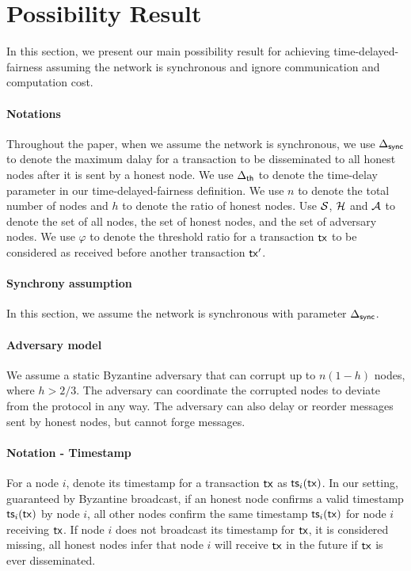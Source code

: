 \section{Possibility Result} \label{sec:result}

In this section, we present our main possibility result for achieving time-delayed-fairness assuming the network is synchronous and ignore communication and computation cost. 


\paragraph{Notations} Throughout the paper, when we assume the network is synchronous, we use $\Delta_{\mathsf{sync}}$ to denote the maximum dalay for a transaction to be disseminated to all honest nodes after it is sent by a honest node. We use $\Delta_{\mathsf{th}}$ to denote the time-delay parameter in our time-delayed-fairness definition. We use $n$ to denote the total number of nodes and $h$ to denote the ratio of honest nodes. Use $\mathcal{S}$, $\mathcal{H}$ and $\mathcal{A}$ to denote the set of all nodes, the set of honest nodes, and the set of adversary nodes. We use $\varphi$ to denote the threshold ratio for a transaction $\mathsf{tx}$ to be considered as received before another transaction $\mathsf{tx}'$. 

\paragraph{Synchrony assumption} In this section, we assume the network is synchronous with parameter $\Delta_{\mathsf{sync}}$.  

\paragraph{Adversary model} We assume a static Byzantine adversary that can corrupt up to $n(1-h)$ nodes, where $h>2/3$. The adversary can coordinate the corrupted nodes to deviate from the protocol in any way. The adversary can also delay or reorder messages sent by honest nodes, but cannot forge messages. 

\paragraph{Notation - Timestamp} For a node $i$, denote its timestamp for a transaction $\mathsf{tx}$ as $\mathsf{ts}_i(\mathsf{tx})$. In our setting, guaranteed by Byzantine broadcast, if an honest node confirms a valid timestamp $\mathsf{ts}_i(\mathsf{tx})$ by node $i$, all other nodes confirm the same timestamp $\mathsf{ts}_i(\mathsf{tx})$ for node $i$ receiving $\mathsf{tx}$. If node $i$ does not broadcast its timestamp for $\mathsf{tx}$, it is considered missing, all honest nodes infer that node $i$ will receive $\mathsf{tx}$ in the future if $\mathsf{tx}$ is ever disseminated. 

